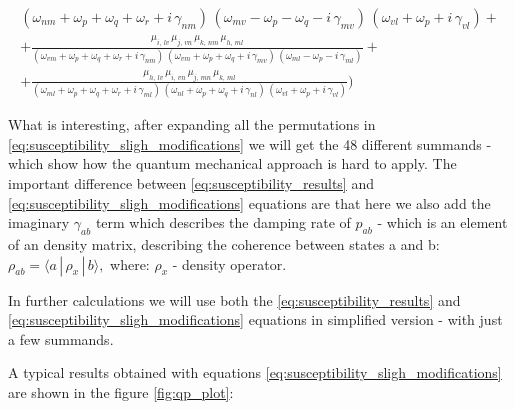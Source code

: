 \documentclass[12pt,twoside,a4paper]{article}
\numberwithin{equation}{subsection}
\numberwithin{figure}{subsection}
\begin{document}
\begin{subequations}
\begin{alignat*}{1}
     {({\omega_{nm}} + {\omega_{p}} + {\omega_{q}} + {\omega_{r}} + i\,{\gamma_{nm}})\,
      ({\omega_{mv}} - {\omega_{p}} - {\omega_{q}} - i\,{\gamma_{mv}})\,
      ({\omega_{vl}} + {\omega_{p}} + i\,{\gamma_{vl}})} 
+\\ +\frac {{\mu_{i,\,lv}}\,{\mu_{j,\,vn}}\,{\mu_{k,\,nm}}\,{\mu_{h,\,ml}}}
     {({\omega_{vm}} + {\omega_{p}} + {\omega_{q}} + {\omega_{r}} + i\,{\gamma_{nm}})\,
      ({\omega_{vm}} + {\omega_{p}} + {\omega_{q}} + i\,{\gamma_{mv}})\,
      ({\omega_{ml}} - {\omega_{p}} - i\,{\gamma_{ml}})} 
+\\ +\frac {{\mu_{h, \,lv}}\,{\mu_{i,\,vn}}\,{\mu_{j,\,mn}}\,{\mu_{k,\,ml}}}
     {({\omega_{ml}} + {\omega_{p}} + {\omega_{q}} + {\omega_{r}} + i\,{\gamma_{ml}})\,
      ({\omega_{nl}} + {\omega_{p}} + {\omega_{q}} + i\,{\gamma_{nl}})\,
      ({\omega_{vl}} + {\omega_{p}} + i\,{\gamma_{vl}})})
  \end{alignat*}
\end{subequations}

What is interesting, after expanding all the permutations in \ref{eq:susceptibility_sligh_modifications} we will get the 48
different summands - which show how the quantum mechanical approach is hard to apply. The important difference between
\ref{eq:susceptibility_results} and \ref{eq:susceptibility_sligh_modifications} equations are that here we also add the imaginary
${\gamma_{ab}}$ term which describes the damping rate of ${p_{ab}}$ - which is an element of an density matrix, describing the
coherence between states a and b: ${\rho_{ab}}=\langle a\, | \,{\rho_{x}}\, | \,b \rangle, $ where: ${\rho_{x}}$ - density
operator.

In further calculations we will use both the \ref{eq:susceptibility_results} and \ref{eq:susceptibility_sligh_modifications}
equations in simplified version - with just a few summands.

A typical results obtained with equations \ref{eq:susceptibility_sligh_modifications} are shown in the figure \ref{fig:qp_plot}:
\end{document}
